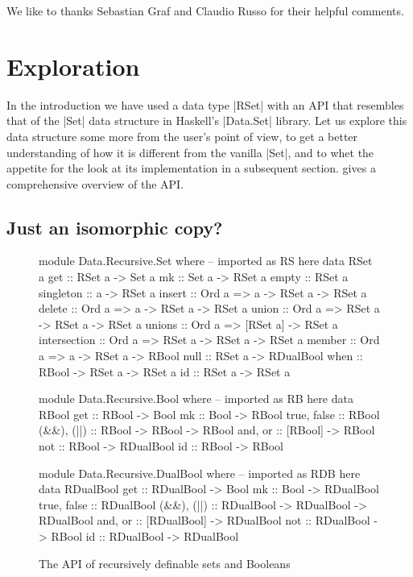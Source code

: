 \documentclass[manuscript,anonymous,screen,acmsmall]{acmart}
\begin{document}
\begin{acks}
We like to thanks Sebastian Graf and Claudio Russo for their helpful comments.
\end{acks}

\section{Exploration}\label{sec:exploration}

In the introduction we have used a data type |RSet| with an API that resembles that of the |Set| data structure in Haskell's |Data.Set| library. Let us explore this data structure some more from the user's point of view, to get a better understanding of how it is different from the vanilla |Set|, and to whet the appetite for the look at its implementation in a subsequent section.
 gives a comprehensive overview of the API.

\subsection{Just an isomorphic copy?}

\afterpage{\clearpage}
\begin{figure}[p]
\begin{code}
module Data.Recursive.Set where       -- imported as RS here
  data RSet a
  get           ::           RSet a ->            Set a
  mk            ::           Set a ->             RSet a
  empty         ::                                RSet a
  singleton     ::           a ->                 RSet a
  insert        :: Ord a =>  a -> RSet a ->       RSet a
  delete        :: Ord a =>  a -> RSet a ->       RSet a
  union         :: Ord a =>  RSet a -> RSet a ->  RSet a
  unions        :: Ord a =>  [RSet a] ->          RSet a
  intersection  :: Ord a =>  RSet a -> RSet a ->  RSet a
  member        :: Ord a =>  a -> RSet a ->       RBool
  null          ::           RSet a ->            RDualBool
  when          ::           RBool -> RSet a ->   RSet a
  id            ::           RSet a ->            RSet a

module Data.Recursive.Bool where      -- imported as RB here
  data RBool
  get          :: RBool ->           Bool
  mk           :: Bool ->            RBool
  true, false  ::                    RBool
  (&&), (||)   :: RBool -> RBool ->  RBool
  and, or      :: [RBool] ->         RBool
  not          :: RBool ->           RDualBool
  id           :: RBool ->           RBool

module Data.Recursive.DualBool where  -- imported as RDB here
  data RDualBool
  get          ::  RDualBool ->               Bool
  mk           ::  Bool ->                    RDualBool
  true, false  ::                             RDualBool
  (&&), (||)   ::  RDualBool -> RDualBool ->  RDualBool
  and, or      ::  [RDualBool] ->             RDualBool
  not          ::  RDualBool ->               RBool
  id           ::  RDualBool ->               RDualBool
\end{code}
\caption{The API of recursively definable sets and Booleans}\label{fig:api}
\end{figure}
\end{document}
